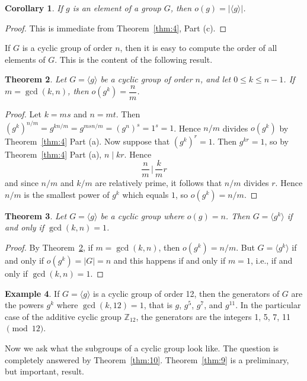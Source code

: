 \documentclass[11pt]{article}
\newcommand{\Z} {{\mathbb Z}}
\newcommand{\divides}{\ensuremath{\mid}}
\theoremstyle{plain}
\newtheorem{thm}{Theorem}%
\newtheorem{cor}[thm]{Corollary}
\theoremstyle{definition}
\newtheorem{ex}[thm]{Example}
\begin{document}
\begin{cor}    If $g$ is an element of a group $G$, then
$o(g)=|\langle g\rangle|$.
\end{cor}
\begin{proof}  This is immediate from Theorem~\ref{thm:4}, Part (c).
\end{proof}

If $G$ is a cyclic group  of order $n$,  then it is easy to
compute the order of all elements of $G$.  This is the content of
the following result.

\begin{thm}
\label{thm:6}
  Let $G=\langle g\rangle $ be a cyclic
group of order $n$, and let $0\le k\le n-1$.  If $m=\gcd (k, n)$,
then $o(g^k)=\dfrac{n}{m}$.
\end{thm}

\begin{proof}  Let $k=ms$ and $n=mt$.  Then
$(g^k)^{n/m}=g^{kn/m}=g^{msn/m}=(g^n)^s=1^s=1$.  Hence $n/m$
divides $o(g^k)$ by Theorem~\ref{thm:4} Part (a).  Now suppose that
$(g^k)^r=1$.  Then $g^{kr} = 1$, so by Theorem~\ref{thm:4} Part (a), $n\divides
kr$. Hence $$\frac{n}{ m}\,\Big|\,\frac{k}{ m} r$$ and since $n/m$
and $k/m$ are relatively prime, it follows that $n/m$ divides $r$.
Hence $n/m$ is the smallest power of $g^k$ which equals $1$, so
$o(g^k)=n/m$.
\end{proof}

\begin{thm}  Let $G=\langle g\rangle$ be a cyclic group where
$o(g)=n$. Then $G=\langle g^k\rangle $ if and only if $\gcd (k, n)
= 1$.
\end{thm}

\begin{proof}  By Theorem~\ref{thm:6},  if $m=\gcd (k, n)$, then $o(g^k)=n/m$.  But
$G=\langle g^k\rangle $ if and only if $o(g^k)=|G|=n$ and this
happens if and only if $m=1$, i.e., if and only if $\gcd(k, n)=1$.
\end{proof}

\begin{ex}
  If $G=\langle g\rangle$ is a cyclic group of order 12, then
the generators of $G$ are the powers $g^k$ where $\gcd (k, 12) =
1$, that is $g$, $g^5$, $g^7$, and $g^{11}$.  In the particular
case of the additive cyclic group $\Z_{12}$, the generators are
the integers 1, 5, 7, 11 $\pmod{12}$.
\end{ex}
Now we ask what the subgroups of a  cyclic group look like.  The
question is completely answered by Theorem~\ref{thm:10}.  
Theorem~\ref{thm:9} is a preliminary, but important, result.
\end{document}
